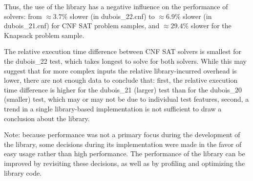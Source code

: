 Thus, the use of the library has a negative influence on the performance of solvers:
from $\approx 3.7\%$ slower (in dubois\_22.cnf) to $\approx 6.9\%$ slower (in dubois\_21.cnf)
for CNF SAT problem samples, and $\approx 29.4\%$ slower for the Knapsack problem sample.

The relative execution time difference between CNF SAT solvers is smallest for the
dubois\_22 test, which takes longest to solve for both solvers. While this may
suggest that for more complex inputs the relative library-incurred overhead is lower,
there are not enough data to conclude that: first, the relative execution
time difference is higher for the dubois\_21 (larger) test than for the dubois\_20 (smaller)
test, which may or may not be due to individual test features, second, a trend in a single
library-based implementation is not sufficient to draw a conclusion about the library.

Note: because performance was not a primary focus during the development of the library,
some decisions during its implementation were made in the favor of easy usage rather than
high performance. The performance of the library can be improved by revisiting these
decisions, as well as by profiling and optimizing the library code.
